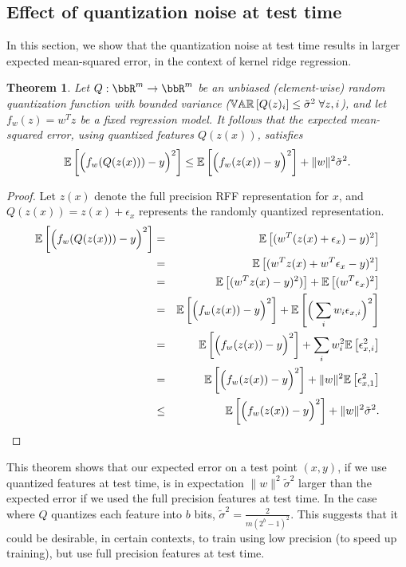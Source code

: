 \documentclass[12pt]{article}
\newcommand{\eps}{\epsilon}
\newcommand{\tsigma}{\tilde{\sigma}}
\newtheorem{theorem}{Theorem}[section]
\begin{document}
\subsection{Effect of quantization noise at test time}
\label{sec:reduce_test_noise_theory}
In this section, we show that the quantization noise at test time results in larger expected 
mean-squared error, in the context of kernel ridge regression.

\begin{theorem}
\label{thm:testvar}
Let $Q:\RR^m\rightarrow\RR^m$ be an unbiased (element-wise) random quantization function with bounded variance ($\var{}{Q(z)_i} \leq \tsigma^2 \; \forall z,i$), and let $f_w(z) = w^T z$ be a fixed regression model.  It follows that the expected mean-squared error, using quantized features $Q(z(x))$, satisfies $$\expect{}{\Big(f_w(Q(z(x))) - y\Big)^2} \leq \expect{}{\Big(f_w(z(x)) - y\Big)^2} + \|w\|^2\tsigma^2.$$
\end{theorem}

\begin{proof}
Let $z(x)$ denote the full precision RFF representation for $x$, and $Q(z(x)) = z(x) + \eps_x$ represents the randomly quantized representation.
\begin{eqnarray*}
	\expect{}{\Big(f_w(Q(z(x))) - y\Big)^2} &=& \expect{}{(w^T (z(x) + \eps_x) -y)^2} \\
	&=& \expect{}{(w^T z(x) + w^T \eps_x -y)^2} \\
	&=& \expect{}{(w^T z(x) - y)^2)} + \expect{}{(w^T \eps_x)^2} \\
	&=&  \expect{}{\Big(f_w(z(x)) - y\Big)^2} + \expect{}{\Big(\sum_i w_i \eps_{x,i}\Big)^2} \\
	&=&  \expect{}{\Big(f_w(z(x)) - y\Big)^2}+ \sum_i w_i^2 \expect{}{\eps_{x,i}^2} \\
	&=&  \expect{}{\Big(f_w(z(x)) - y\Big)^2}  + \|w\|^2\expect{}{\eps_{x,1}^2} \\
	&\leq&  \expect{}{\Big(f_w(z(x)) - y\Big)^2} + \|w\|^2\tsigma^2.
\end{eqnarray*}
\end{proof}
This theorem shows that our expected error on a test point $(x,y)$, if we use quantized features at test time, is in expectation $\|w\|^2\tsigma^2$ larger than the expected error if we used the full precision features at test time.  In the case where $Q$ quantizes each feature into $b$ bits, $\tsigma^2= \frac{2}{m(2^b-1)^2}$.
This suggests that it could be desirable, in certain contexts, to train using low precision (to speed up training), but use full precision features at test time.
\end{document}
